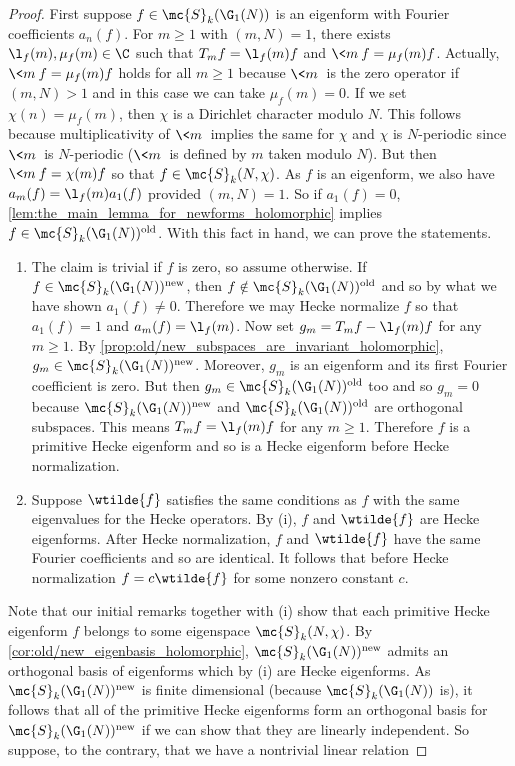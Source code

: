     \begin{proof}
      First suppose $f \in \mc{S}_{k}(\G_{1}(N))$ is an eigenform with Fourier coefficients $a_{n}(f)$. For $m \ge 1$ with $(m,N) = 1$, there exists $\l_{f}(m),\mu_{f}(m) \in \C$ such that $T_{m}f = \l_{f}(m)f$ and $\<m\>f = \mu_{f}(m)f$. Actually, $\<m\>f = \mu_{f}(m)f$ holds for all $m \ge 1$ because $\<m\>$ is the zero operator if $(m,N) > 1$ and in this case we can take $\mu_{f}(m) = 0$. If we set $\chi(n) = \mu_{f}(m)$, then $\chi$ is a Dirichlet character modulo $N$. This follows because multiplicativity of $\<m\>$ implies the same for $\chi$ and $\chi$ is $N$-periodic since $\<m\>$ is $N$-periodic ($\<m\>$ is defined by $m$ taken modulo $N$). But then $\<m\>f = \chi(m)f$ so that $f \in \mc{S}_{k}(N,\chi)$. As $f$ is an eigenform, we also have $a_{m}(f) = \l_{f}(m)a_{1}(f)$ provided $(m,N) = 1$. So if $a_{1}(f) = 0$, \cref{lem:the_main_lemma_for_newforms_holomorphic} implies $f \in \mc{S}_{k}(\G_{1}(N))^{\mathrm{old}}$. With this fact in hand, we can prove the statements.
      \begin{enumerate}[label=(\roman*)]
        \item The claim is trivial if $f$ is zero, so assume otherwise. If $f \in \mc{S}_{k}(\G_{1}(N))^{\mathrm{new}}$, then $f \notin \mc{S}_{k}(\G_{1}(N))^{\mathrm{old}}$ and so by what we have shown $a_{1}(f) \neq 0$. Therefore we may Hecke normalize $f$ so that $a_{1}(f) = 1$ and $a_{m}(f) = \l_{f}(m)$. Now set $g_{m} = T_{m}f-\l_{f}(m)f$ for any $m \ge 1$. By \cref{prop:old/new_subspaces_are_invariant_holomorphic}, $g_{m} \in \mc{S}_{k}(\G_{1}(N))^{\mathrm{new}}$. Moreover, $g_{m}$ is an eigenform and its first Fourier coefficient is zero. But then $g_{m} \in \mc{S}_{k}(\G_{1}(N))^{\mathrm{old}}$ too and so $g_{m} = 0$ because $\mc{S}_{k}(\G_{1}(N))^{\mathrm{new}}$ and $\mc{S}_{k}(\G_{1}(N))^{\mathrm{old}}$ are orthogonal subspaces. This means $T_{m}f = \l_{f}(m)f$ for any $m \ge 1$. Therefore $f$ is a primitive Hecke eigenform and so is a Hecke eigenform before Hecke normalization.
        \item Suppose $\wtilde{f}$ satisfies the same conditions as $f$ with the same eigenvalues for the Hecke operators. By (i), $f$ and $\wtilde{f}$ are Hecke eigenforms. After Hecke normalization, $f$ and $\wtilde{f}$ have the same Fourier coefficients and so are identical. It follows that before Hecke normalization $f = c\wtilde{f}$ for some nonzero constant $c$.
      \end{enumerate}
      Note that our initial remarks together with (i) show that each primitive Hecke eigenform $f$ belongs to some eigenspace $\mc{S}_{k}(N,\chi)$. By \cref{cor:old/new_eigenbasis_holomorphic}, $\mc{S}_{k}(\G_{1}(N))^{\mathrm{new}}$ admits an orthogonal basis of eigenforms which by (i) are Hecke eigenforms. As $\mc{S}_{k}(\G_{1}(N))^{\mathrm{new}}$ is finite dimensional (because $\mc{S}_{k}(\G_{1}(N))$ is), it follows that all of the primitive Hecke eigenforms form an orthogonal basis for $\mc{S}_{k}(\G_{1}(N))^{\mathrm{new}}$ if we can show that they are linearly independent. So suppose, to the contrary, that we have a nontrivial linear relation

\end{proof}
